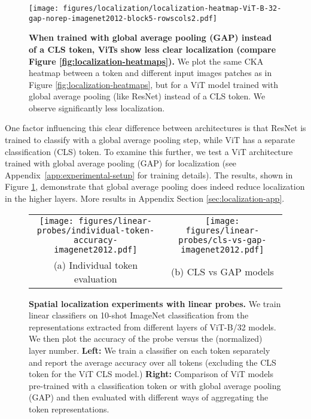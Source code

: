 \documentclass{article}
\begin{document}
\begin{figure}[t]
    \centering
    \texttt{[image: figures/localization/localization-heatmap-ViT-B-32-gap-norep-imagenet2012-block5-rowscols2.pdf]} 
    \caption{\small \textbf{When trained with global average pooling (GAP) instead of a CLS token, ViTs show less clear localization (compare Figure \ref{fig:localization-heatmaps}).} We plot the same CKA heatmap between a token and different input images patches as in Figure \ref{fig:localization-heatmaps}, but for a ViT model trained with global average pooling (like ResNet) instead of a CLS token. We observe significantly less localization.}
    \label{fig:localization-heatmaps-gap}
    \vspace{-1em}
\end{figure}

One factor influencing this clear difference between architectures is that ResNet is trained to classify with a global average pooling step, while ViT has a separate classification (CLS) token. To examine this further, we test a ViT architecture trained with global average pooling (GAP) for localization (see Appendix~\ref{app:experimental-setup} for training details). The results, shown in Figure \ref{fig:localization-heatmaps-gap}, demonstrate that global average pooling does indeed reduce localization in the higher layers. More results in Appendix Section \ref{sec:localization-app}.

\begin{figure}[t]
    \centering
    \footnotesize
    \begin{tabular}{cc}
    \texttt{[image: figures/linear-probes/individual-token-accuracy-imagenet2012.pdf]} &
      \texttt{[image: figures/linear-probes/cls-vs-gap-imagenet2012.pdf]} \\
      (a) Individual token evaluation &
      (b) CLS vs GAP models  \\
    \end{tabular}
    \caption{\textbf{Spatial localization experiments with linear probes.} We train linear classifiers on 10-shot ImageNet classification from the representations extracted from different layers of ViT-B/32 models. We then plot the accuracy of the probe versus the (normalized) layer number. \textbf{Left:} We train a classifier on each token separately and report the average accuracy over all tokens (excluding the CLS token for the ViT CLS model.) \textbf{Right:} Comparison of ViT models pre-trained with a classification token or with global average pooling (GAP) and then evaluated with different ways of aggregating the token representations.}
    \label{fig:linear-probes-2}
    \vspace{-1em}
\end{figure}
\end{document}
